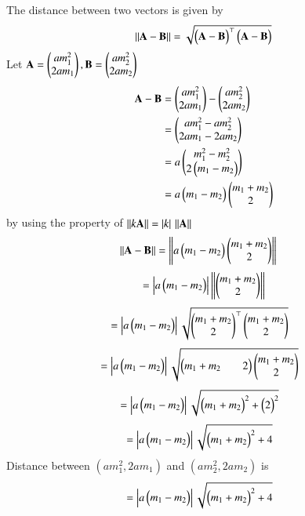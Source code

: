 The distance between two vectors is given by 
\begin{align}
\norm{\vec{A}-\vec{B}}=\sqrt{\myvec{\vec{A}-\vec{B}}^
\top \myvec{\vec{A}-\vec{B}}}
\end{align}
Let $\vec{A}={\myvec{am_1^2\\2am_1}, \vec{B}=\myvec{am_2^2\\2am_2}}$
\begin{align}
\vec{A}-\vec{B}&=\myvec{am_1^2\\2am_1}-\myvec{am_2^2\\2am_2}
\\&=\myvec{am_1^2-am_2^2\\2am_1-2am_2}
\\&=a\myvec{m_1^2-m_2^2\\2\myvec{m_1-m_2}}
\\&=a\myvec{m_1-m_2}\myvec{m_1+m_2\\2}
\end{align}
by using the property of $\norm{k\vec{A}}=\abs{k} \,\norm{\vec{A}}$
\begin{align}
\norm{\vec{A}-\vec{B}}&=\norm{a\myvec{m_1-m_2}\myvec{m_1+m_2\\2}}
\end{align}
\begin{align}
=\abs{a\myvec{m_1-m_2}}\norm{\myvec{m_1+m_2\\2}}
\end{align}
\begin{align}
&=\abs{a\myvec{m_1-m_2}}\sqrt{\myvec{m_1+m_2\\2}^
\top\myvec{m_1+m_2\\2}}
\end{align}
\begin{align}
&=\abs{a\myvec{m_1-m_2}}\sqrt{\myvec{m_1+m_2&&2}\myvec{m_1+m_2\\2}}
\end{align}
\begin{align}
&=\abs{a\myvec{m_1-m_2}}\sqrt{\myvec{m_1+m_2}^2+\myvec{2}^2}\label{eq2}
\end{align}
\begin{align}
&=\abs{a\myvec{m_1-m_2}}\sqrt{\myvec{m_1+m_2}^2+4}
\end{align}
Distance between $(am_1^2,2am_1)$ and $(am_2^2,2am_2)$ is
\begin{align}
&=\abs{a\myvec{m_1-m_2}}\sqrt{\myvec{m_1+m_2}^2+4}
\end{align}
